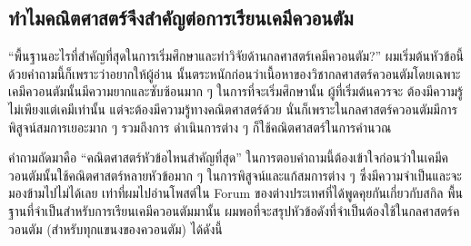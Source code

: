 \subsection{ทำไมคณิตศาสตร์จึงสำคัญต่อการเรียนเคมีควอนตัม}

\enquote{พื้นฐานอะไรที่สำคัญที่สุดในการเริ่มศึกษาและทำวิจัยด้านกลศาสตร์เคมีควอนตัม?} ผมเริ่มต้นหัวข้อนี้ด้วยคำถามนี้ก็เพราะว่าอยากให้ผู้อ่าน%
นั้นตระหนักก่อนว่าเนื้อหาของวิชากลศาสตร์ควอนตัมโดยเฉพาะเคมีควอนตัมนั้นมีความยากและซับซ้อนมาก ๆ ในการที่จะเริ่มศึกษานั้น ผู้ที่เริ่มต้นควรจะ%
ต้องมีความรู้ไม่เพียงแต่เคมีเท่านั้น แต่จะต้องมีความรู้ทางคณิตศาสตร์ด้วย นั่นก็เพราะในกลศาสตร์ควอนตัมมีการพิสูจน์สมการเยอะมาก ๆ รวมถึงการ%
ดำเนินการต่าง ๆ ก็ใช้คณิตศาสตร์ในการคำนวณ

คำถามถัดมาคือ \enquote{คณิตศาสตร์หัวข้อไหนสำคัญที่สุด} ในการตอบคำถามนี้ต้องเข้าใจก่อนว่าในเคมีควอนตัมนั้นใช้คณิตศาสตร์หลายหัวข้อมาก ๆ
ในการพิสูจน์และแก้สมการต่าง ๆ ซึ่งมีความจำเป็นและจะมองข้ามไปไม่ได้เลย เท่าที่ผมไปอ่านโพสต์ใน Forum ของต่างประเทศที่ได้พูดคุยกันเกี่ยวกับสกิล%
พื้นฐานที่จำเป็นสำหรับการเรียนเคมีควอนตัมมานั้น ผมพอที่จะสรุปหัวข้อดังที่จำเป็นต้องใช้ในกลศาสตร์ควอนตัม (สำหรับทุกแขนงของควอนตัม) ได้ดังนี้


